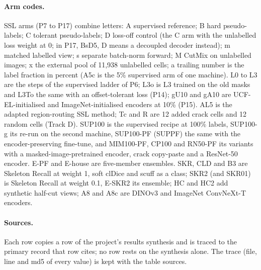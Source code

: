 \paragraph{Arm codes.} SSL arms (P7 to P17) combine letters: A supervised reference; B hard pseudo-labels; C tolerant pseudo-labels;
D loss-off control (the C arm with the unlabelled loss weight at 0; in P17, BsD5, D means a decoupled decoder instead); m matched
labelled view; s separate batch-norm forward; M CutMix on unlabelled images; x the external pool of 11,938 unlabelled cells; a
trailing number is the label fraction in percent (A5c is the 5\% supervised arm of one machine). L0 to L3 are the steps of the
supervised ladder of P6; L3o is L3 trained on the old masks and L3To the same with an offset-tolerant loss (P14); gU10 and gA10 are
UCF-EL-initialised and ImageNet-initialised encoders at 10\% (P15). AL5 is the adapted region-routing SSL method; Tc and R are 12
added crack cells and 12 random cells (Track D). SUP100 is the supervised recipe at 100\% labels, SUP100-g its re-run on the second
machine, SUP100-PF (SUPPF) the same with the encoder-preserving fine-tune, and MIM100-PF, CP100 and RN50-PF its variants with a
masked-image-pretrained encoder, crack copy-paste and a ResNet-50 encoder. E-PF and E-house are five-member ensembles. SKR, CLD and B3
are Skeleton Recall at weight 1, soft clDice and scuff as a class; SKR2 (and SKR01) is Skeleton Recall at weight 0.1, E-SKR2 its
ensemble; HC and HC2 add synthetic half-cut views; A8 and A8c are DINOv3 and ImageNet ConvNeXt-T encoders.

\paragraph{Sources.} Each row copies a row of the project's results synthesis and is traced to the primary record that row cites;
no row rests on the synthesis alone. The trace (file, line and md5 of every value) is kept with the table sources.

